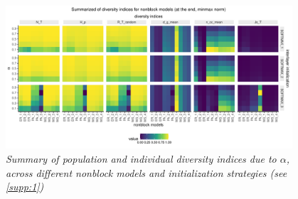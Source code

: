 \begin{figure}[H]
    \centering
    \includegraphics[width=0.95\textwidth,center]{../figures/report/FigS3.pdf}
    \caption{\label{supp:3}
    \textit{Summary  of  population  and  individual  diversity  indices  due  to $\alpha$,  across  different  nonblock  models
    and initialization strategies (see \autoref{supp:1})}
    }
\end{figure}